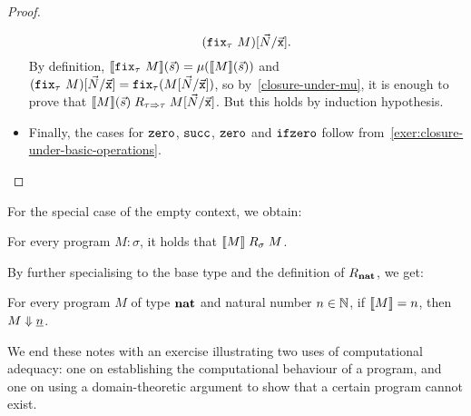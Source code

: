 \begin{proof}
\begin{itemize}
\[      \pa*{\pcffix_\tau\,M}[\vec{N}/\vec{\var x}].
    \]
    By definition,
    \(\densem{\pcffix_\tau\,M}(\vec s) = \mu\pa*{\densem{M}(\vec s)}\) and
    \(\pa*{\pcffix_\tau\, M}[\vec{N}/\vec{\var x}] =
    \pcffix_\tau\pa{M[\vec{N}/\vec{\var{x}}]}\), so by~\cref{closure-under-mu},
    it is enough to prove that
    \(\llbracket M\rrbracket(\vec s) \mathrel{R}_{\tau \Rightarrow \tau}
    M[\vec{N}/\vec{\mathtt{x}}]\). But this holds by induction hypothesis.
  \item Finally, the cases for \(\mathtt{zero}\), \(\operatorname{\mathtt{succ}}\), \(\mathtt{zero}\) and
    \(\operatorname{\mathtt{ifzero}}\) follow from~\cref{exer:closure-under-basic-operations}. \qedhere
  \end{itemize}
\end{proof}

For the special case of the empty context, we obtain:
\begin{corollary}
  For every program \(M : \sigma\), it holds that
  \(\llbracket M\rrbracket \mathrel{R}_\sigma M\).
\end{corollary}
%
By further specialising to the base type and the definition of
\(\mathrel{R}_\mathtt{\mathbf{nat}}\), we get:
\begin{theorem}\label{adequacy}
  For every program \(M\) of type \(\mathtt{\mathbf{nat}}\) and natural number \(n \in \mathbb N\),
  if \(\llbracket M\rrbracket = n\), then \(M \Downarrow \underline{n}\).
\end{theorem}

We end these notes with an exercise illustrating two uses of computational
adequacy: one on establishing the computational behaviour of a program, and one
on using a domain-theoretic argument to show that a certain program cannot
exist.

